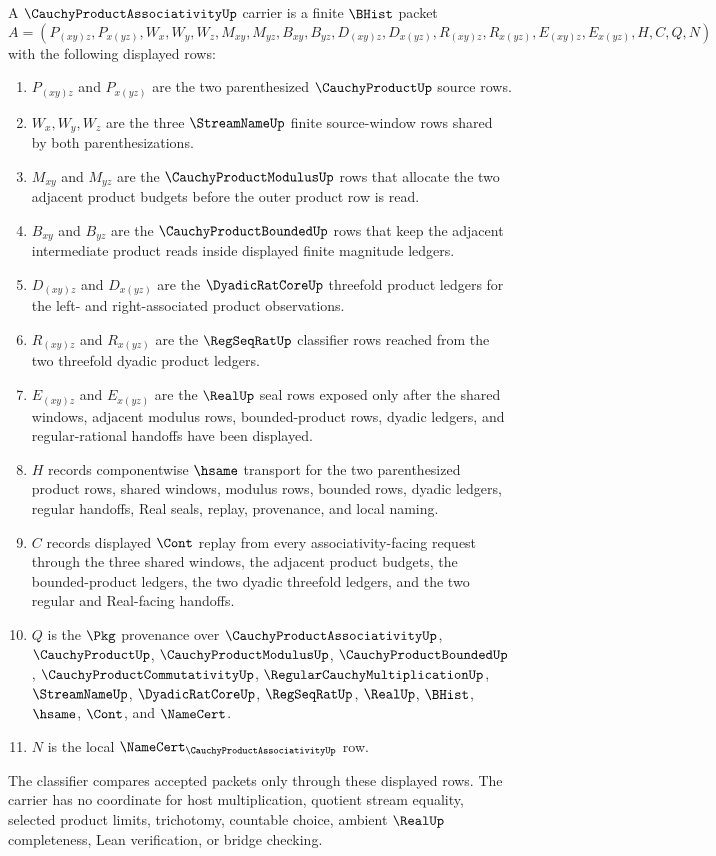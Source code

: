 \begin{definition}
\label{def:cauchy-product-associativity-carrier}
A $\CauchyProductAssociativityUp$ carrier is a finite $\BHist$ packet
$$
A=(P_{(xy)z},P_{x(yz)},W_x,W_y,W_z,M_{xy},M_{yz},B_{xy},B_{yz},D_{(xy)z},D_{x(yz)},R_{(xy)z},R_{x(yz)},E_{(xy)z},E_{x(yz)},H,C,Q,N)
$$
with the following displayed rows:
\begin{enumerate}
\item $P_{(xy)z}$ and $P_{x(yz)}$ are the two parenthesized $\CauchyProductUp$ source rows.
\item $W_x,W_y,W_z$ are the three $\StreamNameUp$ finite source-window rows shared by both parenthesizations.
\item $M_{xy}$ and $M_{yz}$ are the $\CauchyProductModulusUp$ rows that allocate the two adjacent product budgets before the outer product row is read.
\item $B_{xy}$ and $B_{yz}$ are the $\CauchyProductBoundedUp$ rows that keep the adjacent intermediate product reads inside displayed finite magnitude ledgers.
\item $D_{(xy)z}$ and $D_{x(yz)}$ are the $\DyadicRatCoreUp$ threefold product ledgers for the left- and right-associated product observations.
\item $R_{(xy)z}$ and $R_{x(yz)}$ are the $\RegSeqRatUp$ classifier rows reached from the two threefold dyadic product ledgers.
\item $E_{(xy)z}$ and $E_{x(yz)}$ are the $\RealUp$ seal rows exposed only after the shared windows, adjacent modulus rows, bounded-product rows, dyadic ledgers, and regular-rational handoffs have been displayed.
\item $H$ records componentwise $\hsame$ transport for the two parenthesized product rows, shared windows, modulus rows, bounded rows, dyadic ledgers, regular handoffs, Real seals, replay, provenance, and local naming.
\item $C$ records displayed $\Cont$ replay from every associativity-facing request through the three shared windows, the adjacent product budgets, the bounded-product ledgers, the two dyadic threefold ledgers, and the two regular and Real-facing handoffs.
\item $Q$ is the $\Pkg$ provenance over $\CauchyProductAssociativityUp$, $\CauchyProductUp$, $\CauchyProductModulusUp$, $\CauchyProductBoundedUp$, $\CauchyProductCommutativityUp$, $\RegularCauchyMultiplicationUp$, $\StreamNameUp$, $\DyadicRatCoreUp$, $\RegSeqRatUp$, $\RealUp$, $\BHist$, $\hsame$, $\Cont$, and $\NameCert$.
\item $N$ is the local $\NameCert_{\CauchyProductAssociativityUp}$ row.
\end{enumerate}
The classifier compares accepted packets only through these displayed rows. The carrier has no coordinate for host multiplication, quotient stream equality, selected product limits, trichotomy, countable choice, ambient $\RealUp$ completeness, Lean verification, or bridge checking.
\end{definition}

